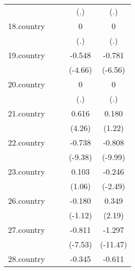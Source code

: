 {\begin{tabular}{l*{4}{c}}
            &                     &                     &         (.)         &         (.)         \\
[1em]
18.country  &                     &                     &           0         &           0         \\
            &                     &                     &         (.)         &         (.)         \\
[1em]
19.country  &                     &                     &      -0.548\sym{***}&      -0.781\sym{***}\\
            &                     &                     &     (-4.66)         &     (-6.56)         \\
[1em]
20.country  &                     &                     &           0         &           0         \\
            &                     &                     &         (.)         &         (.)         \\
[1em]
21.country  &                     &                     &       0.616\sym{***}&       0.180         \\
            &                     &                     &      (4.26)         &      (1.22)         \\
[1em]
22.country  &                     &                     &      -0.738\sym{***}&      -0.808\sym{***}\\
            &                     &                     &     (-9.38)         &     (-9.99)         \\
[1em]
23.country  &                     &                     &       0.103         &      -0.246\sym{*}  \\
            &                     &                     &      (1.06)         &     (-2.49)         \\
[1em]
26.country  &                     &                     &      -0.180         &       0.349\sym{*}  \\
            &                     &                     &     (-1.12)         &      (2.19)         \\
[1em]
27.country  &                     &                     &      -0.811\sym{***}&      -1.297\sym{***}\\
            &                     &                     &     (-7.53)         &    (-11.47)         \\
[1em]
28.country  &                     &                     &      -0.345\sym{***}&      -0.611\sym{***}\\

\end{tabular}}
